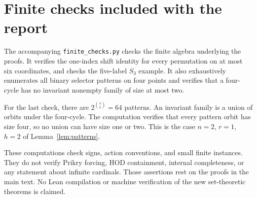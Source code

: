 \documentclass[11pt,letterpaper]{article}
\theoremstyle{definition}
\numberwithin{equation}{section}
\begin{document}
\clearpage
\appendix
\section{Finite checks included with the report}\label{app:checks}

The accompanying \texttt{finite\_checks.py} checks the finite algebra underlying the proofs. It verifies the one-index shift identity for every permutation on at most six coordinates, and checks the five-label $S_3$ example. It also exhaustively enumerates all binary selector patterns on four points and verifies that a four-cycle has no invariant nonempty family of size at most two.

For the last check, there are $2^{\binom42}=64$ patterns. An invariant family is a union of orbits under the four-cycle. The computation verifies that every pattern orbit has size four, so no union can have size one or two. This is the case $n=2$, $r=1$, $h=2$ of Lemma~\ref{lem:patterns}.

These computations check signs, action conventions, and small finite instances. They do not verify Prikry forcing, HOD containment, internal completeness, or any statement about infinite cardinals. Those assertions rest on the proofs in the main text. No Lean compilation or machine verification of the new set-theoretic theorems is claimed.
\end{document}
